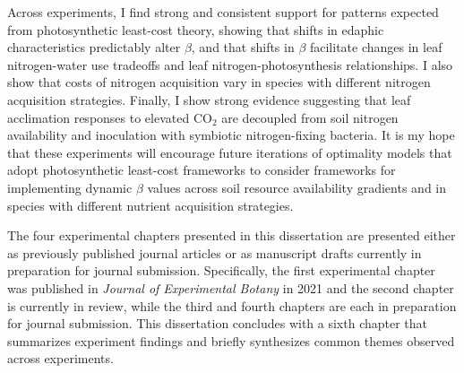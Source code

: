 Across experiments, I find strong and consistent support for patterns expected from photosynthetic least-cost theory, showing that shifts in edaphic characteristics predictably alter $\beta$, and that shifts in $\beta$ facilitate changes in leaf nitrogen-water use tradeoffs and leaf nitrogen-photosynthesis relationships. I also show that costs of nitrogen acquisition vary in species with different nitrogen acquisition strategies. Finally, I show strong evidence suggesting that leaf acclimation responses to elevated CO$_2$ are decoupled from soil nitrogen availability and inoculation with symbiotic nitrogen-fixing bacteria. It is my hope that these experiments will encourage future iterations of optimality models that adopt photosynthetic least-cost frameworks to consider frameworks for implementing dynamic $\beta$ values across soil resource availability gradients and in species with different nutrient acquisition strategies.

The four experimental chapters presented in this dissertation are presented either as previously published journal articles or as manuscript drafts currently in preparation for journal submission. Specifically, the first experimental chapter was published in \textit{Journal of Experimental Botany} in 2021 and the second chapter is currently in review, while the third and fourth chapters are each in preparation for journal submission. This dissertation concludes with a sixth chapter that summarizes experiment findings and briefly synthesizes common themes observed across experiments.